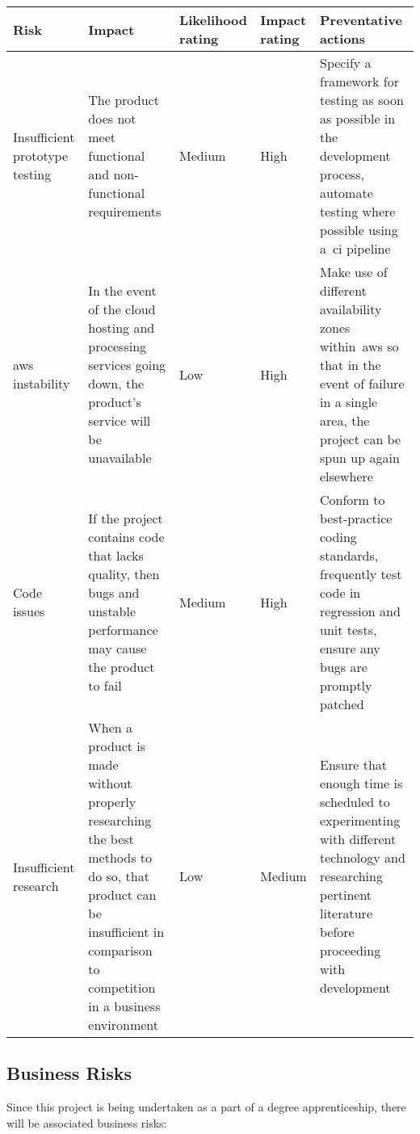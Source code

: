 \begin{tabularx}{\textwidth}{szssz}
    \caption{Product Risks}\label{tab:product-risks}\\
    \hline
    \textbf{Risk} & \textbf{Impact} & \textbf{Likelihood rating} & \textbf{Impact rating} & \textbf{Preventative actions} \\\hline
    Insufficient prototype testing & The product does not meet functional and non-functional requirements & Medium & High & Specify a framework for testing as soon as possible in the development process, automate testing where possible using a~\gls{ci} pipeline\\\hline
    \gls{aws} instability & In the event of the cloud hosting and processing services going down, the product's service will be unavailable & Low & High & Make use of different availability zones within~\gls{aws} so that in the event of failure in a single area, the project can be spun up again elsewhere \\\hline
    Code issues & If the project contains code that lacks quality, then bugs and unstable performance may cause the product to fail & Medium & High & Conform to best-practice coding standards, frequently test code in regression and unit tests, ensure any bugs are promptly patched \\\hline
    Insufficient research & When a product is made without properly researching the best methods to do so, that product can be insufficient in comparison to competition in a business environment & Low & Medium & Ensure that enough time is scheduled to experimenting with different technology and researching pertinent literature before proceeding with development

\end{tabularx}

\subsection{Business Risks}\label{subsec:business-risks}
Since this project is being undertaken as a part of a degree apprenticeship, there will be associated business risks:

